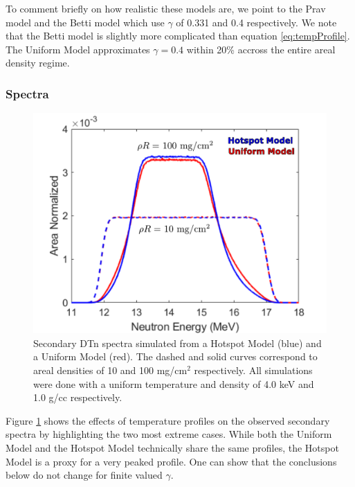 	    To comment briefly on how realistic these models are, we point to the Prav model \cite{bibid} and the Betti model \cite{bibid} which use $\gamma$ of 0.331 and 0.4 respectively. We note that the Betti model is slightly more complicated than equation \ref{eq:tempProfile}. The Uniform Model approximates $\gamma=0.4$ within 20\% accross the entire areal density regime. 
	
	\subsubsection{Spectra}
	
	    \begin{figure}[h!]
	        \centering
	        \includegraphics[scale=0.8]{Figures/spectraProfileEffects.pdf}
	        \caption[Profile Effects on Spectra]{Secondary DTn spectra simulated from a Hotspot Model (blue) and a Uniform Model (red). The dashed and solid curves correspond to areal densities of 10 and 100 mg/cm$^2$ respectively. All simulations were done with a uniform temperature and density of 4.0 keV and 1.0 g/cc respectively.}
	        \label{fig:spectraProfiles}
	    \end{figure}
	    
	    Figure \ref{fig:spectraProfiles} shows the effects of temperature profiles on the observed secondary spectra by highlighting the two most extreme cases. While both the Uniform Model and the Hotspot Model technically share the same profiles, the Hotspot Model is a proxy for a very peaked profile. One can show that the conclusions below do not change for finite valued $\gamma$.
	    
